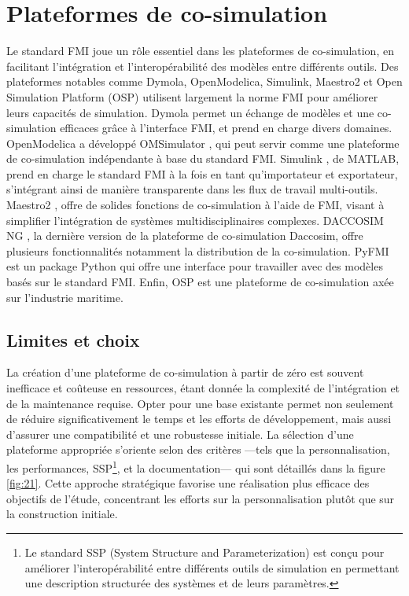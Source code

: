 \section{Plateformes de co-simulation}
Le standard FMI joue un rôle essentiel dans les plateformes de co-simulation, en facilitant l'intégration et l'interopérabilité des modèles entre différents outils. Des plateformes notables comme Dymola, OpenModelica, Simulink, Maestro2 et Open Simulation Platform (OSP) utilisent largement la norme FMI pour améliorer leurs capacités de simulation. Dymola \cite{17} permet un échange de modèles et une co-simulation efficaces grâce à l'interface FMI, et prend en charge divers domaines. OpenModelica a développé OMSimulator \cite{b14}, qui peut servir comme une plateforme de co-simulation indépendante à base du standard FMI. Simulink \cite{b17}, de MATLAB, prend en charge le standard FMI à la fois en tant qu'importateur et exportateur, s'intégrant ainsi de manière transparente dans les flux de travail multi-outils. Maestro2 \cite{b13}, offre de solides fonctions de co-simulation à l'aide de FMI, visant à simplifier l'intégration de systèmes multidisciplinaires complexes. DACCOSIM NG \cite{b15}, la dernière version de la plateforme de co-simulation Daccosim, offre plusieurs fonctionnalités notamment la distribution de la co-simulation. PyFMI \cite{b16} est un package Python qui offre une interface pour travailler avec des modèles basés sur le standard FMI.
Enfin, OSP \cite{18} est une plateforme de co-simulation axée sur l'industrie maritime.

\subsection{Limites et choix}
La création d'une plateforme de co-simulation à partir de zéro est souvent inefficace et coûteuse en ressources, étant donnée la complexité de l'intégration et de la maintenance requise. Opter pour une base existante permet non seulement de réduire significativement le temps et les efforts de développement, mais aussi d'assurer une compatibilité et une robustesse initiale. La sélection d'une plateforme appropriée s'oriente selon des critères —tels que la personnalisation, les performances, SSP\footnote{Le standard SSP (System Structure and Parameterization) est conçu pour améliorer l'interopérabilité entre différents outils de simulation en permettant une description structurée des systèmes et de leurs paramètres.}, et la documentation— qui sont détaillés dans la figure \ref{fig:21}. Cette approche stratégique favorise une réalisation plus efficace des objectifs de l'étude, concentrant les efforts sur la personnalisation plutôt que sur la construction initiale.

